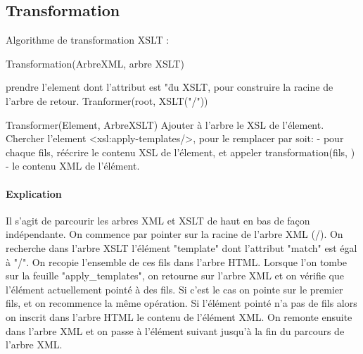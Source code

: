         
    \subsection{Transformation}
     Algorithme de transformation XSLT :

	Transformation(ArbreXML, arbre XSLT)
	
		prendre l'element dont l'attribut est "\" du XSLT, pour construire la racine de l'arbre de retour.
		Tranformer(root, XSLT("/"))
	
	Transformer(Element, ArbreXSLT)	
		Ajouter à l'arbre le XSL de l'élement.
		Chercher l'element <xsl:apply-templates/>, pour le remplacer par soit:
			- pour chaque fils, réécrire le contenu XSL de l'élement, et appeler transformation(fils, ) 
			- le contenu XML de l'élément.

 
	\paragraph{Explication} Il s'agit de parcourir les arbres XML et XSLT de haut en bas de façon indépendante.
	On commence par pointer sur la racine de l'arbre XML (/). On recherche dans l'arbre XSLT l'élément "template" dont l'attribut "match" est égal à "/".
	On recopie l'ensemble de ces fils dans l'arbre HTML. Lorsque l'on tombe sur la feuille "apply_templates", on retourne sur l'arbre XML et on vérifie que l'élément actuellement pointé à des fils. Si c'est le cas on pointe sur le premier fils, et on recommence la même opération. Si l'élément pointé n'a pas de fils alors on inscrit dans l'arbre HTML le contenu de l'élément XML. On remonte ensuite dans l'arbre XML et on passe à l'élément suivant jusqu'à la fin du parcours de l'arbre XML.

